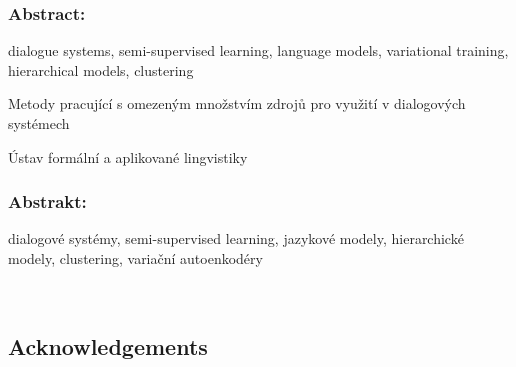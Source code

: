 \documentclass[12pt,notitlepage,a4paper,openright]{report}
\begin{document}
\subsubsection{Abstract:}



\begin{description}[leftmargin=7.5em,labelwidth=7em,labelindent=0em,labelsep=0.5em]
\item[Keywords:]dialogue systems, semi-supervised learning, language models, variational training, hierarchical models, clustering
\end{description}


\cleardoublepage{}
\begin{description}[leftmargin=7.5em,labelwidth=7em,labelindent=0em,labelsep=0.5em]
\item[Název práce:] Metody pracující s omezeným množstvím zdrojů pro využití v dialogových systémech 
\item[Autor:] \theauthor{}
\item[Katedra:] Ústav formální a aplikované lingvistiky
\item[Vedoucí práce:] \thesupervisor{}
\end{description}

\subsubsection{Abstrakt:}



\begin{description}[leftmargin=7.5em,labelwidth=7em,labelindent=0em,labelsep=0.5em]
%
\item[Klíčová slova:] dialogové systémy, semi-supervised learning, jazykové modely, hierarchické modely, clustering, variační autoenkodéry

%
\end{description}





\cleardoublepage{}
\ \vspace{10mm}

\subsection*{Acknowledgements}
\end{document}
